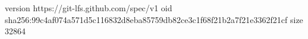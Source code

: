 version https://git-lfs.github.com/spec/v1
oid sha256:99c4af074a571d5c116832d8eba85759db82ce3c1f68f21b2a7f21e3362f21cf
size 32864
